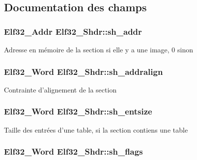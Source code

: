 \subsection{Documentation des champs}
\hypertarget{structElf32__Shdr_a7e668a62cee74a2f9c6edabb5f45635a}{
\subsubsection[{sh\-\_\-addr}]{\setlength{\rightskip}{0pt plus 5cm}Elf32\-\_\-\-Addr Elf32\-\_\-\-Shdr\-::sh\-\_\-addr}}\label{structElf32__Shdr_a7e668a62cee74a2f9c6edabb5f45635a}
Adresse en mémoire de la section si elle y a une image, 0 sinon \hypertarget{structElf32__Shdr_a399f50b3591e6286d4ad819f790979ed}{
\subsubsection[{sh\-\_\-addralign}]{\setlength{\rightskip}{0pt plus 5cm}Elf32\-\_\-\-Word Elf32\-\_\-\-Shdr\-::sh\-\_\-addralign}}\label{structElf32__Shdr_a399f50b3591e6286d4ad819f790979ed}
Contrainte d'alignement de la section \hypertarget{structElf32__Shdr_a10c59cecc928aae27930601fe545d3ca}{
\subsubsection[{sh\-\_\-entsize}]{\setlength{\rightskip}{0pt plus 5cm}Elf32\-\_\-\-Word Elf32\-\_\-\-Shdr\-::sh\-\_\-entsize}}\label{structElf32__Shdr_a10c59cecc928aae27930601fe545d3ca}
Taille des entrées d'une table, si la section contiens une table \hypertarget{structElf32__Shdr_a27e003d8da37de3038a0065577a7743d}{
\subsubsection[{sh\-\_\-flags}]{\setlength{\rightskip}{0pt plus 5cm}Elf32\-\_\-\-Word Elf32\-\_\-\-Shdr\-::sh\-\_\-flags}}\label{structElf32__Shdr_a27e003d8da37de3038a0065577a7743d}
